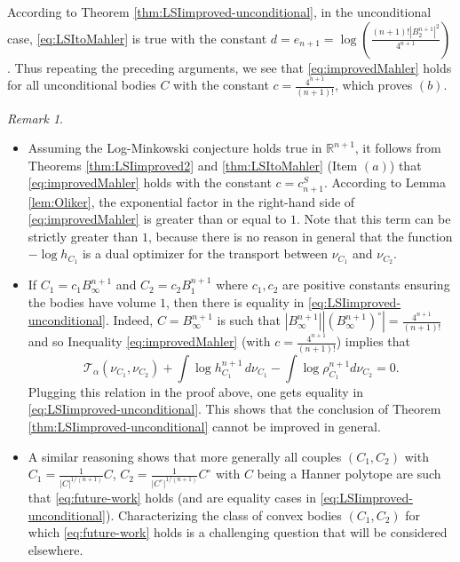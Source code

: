 \documentclass[10pt]{amsart}
\theoremstyle{definition}
\theoremstyle{remark}
\newtheorem{rem}[thm]{Remark}
\newcommand{\R}{\mathbb{R}}
\begin{document}
According to Theorem \ref{thm:LSIimproved-unconditional}, in the unconditional case, \eqref{eq:LSItoMahler} is true with the constant $d=e_{n+1}=\log \left(\frac{(n+1)!|B_2^{n+1}|^2}{4^{n+1}}\right)$. Thus repeating the preceding arguments, we see that \eqref{eq:improvedMahler} holds for all unconditional bodies $C$ with the constant $c=\frac{4^{n+1}}{(n+1)!}$, which proves $(b)$.
\endproof

\begin{rem}\label{rem:sharpness}\ 
\begin{itemize}
\item Assuming the Log-Minkowski conjecture holds true in $\R^{n+1}$, it follows from Theorems \ref{thm:LSIimproved2} and \ref{thm:LSItoMahler} (Item $(a)$) that \eqref{eq:improvedMahler} holds with the constant $c=c^S_{n+1}$. According to Lemma \ref{lem:Oliker}, the exponential factor in the right-hand side of \eqref{eq:improvedMahler} is greater than or equal to $1$. Note that this term can be strictly greater than $1$, because there is no reason in general that the function $-\log h_{C_1}$ is a dual optimizer for the transport between $\nu_{C_1}$ and $\nu_{C_2}$. 
\item If $C_1 = c_1B_\infty^{n+1}$ and $C_2 = c_2B_1^{n+1}$ where $c_1,c_2$ are positive constants ensuring the bodies have volume $1$, then there is equality in \eqref{eq:LSIimproved-unconditional}. Indeed, $C=B_\infty^{n+1}$ is such that $|B_\infty^{n+1}| |(B_\infty^{n+1})^\circ| = \frac{4^{n+1}}{(n+1)!}$ and so Inequality \eqref{eq:improvedMahler} (with $c=\frac{4^{n+1}}{(n+1)!}$) implies that 
\begin{equation}\label{eq:future-work}
\mathcal{T}_\alpha(\nu_{C_1},\nu_{C_2})+ \int \log h_{C_1}^{n+1}\,d\nu_{C_1} - \int \log \rho_{C_1}^{n+1}d\nu_{C_2}=0.
\end{equation}
Plugging this relation in the proof above, one gets equality in \eqref{eq:LSIimproved-unconditional}. This shows that the conclusion of Theorem \ref{thm:LSIimproved-unconditional} cannot be improved in general.
\item A similar reasoning shows that more generally all couples $(C_1,C_2)$ with $C_1 = \frac{1}{|C|^{1/(n+1)}}C$, $C_2 =  \frac{1}{|C^\circ|^{1/(n+1)}}C^\circ$ with $C$ being a Hanner polytope are such that \eqref{eq:future-work} holds (and are equality cases in \eqref{eq:LSIimproved-unconditional}). Characterizing the class of convex bodies $(C_1,C_2)$ for which \eqref{eq:future-work} holds is a challenging question that will be considered elsewhere.
\end{itemize}
\end{rem}
\end{document}
